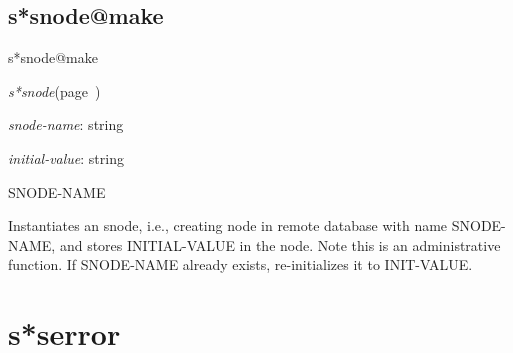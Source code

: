\subsection{s*snode@make}
\label{s*snode@make}

\begin{description}
\item [Name:]  s*snode@make

\item [Class:]
{\sl s*snode}\hfill(page~\pageref{s*snode})

\item [Parameters:]
\item {\sl snode-name}:  string

\item {\sl initial-value}:  string


\item [Return-value:] SNODE-NAME

\item [Description:]
Instantiates an snode, i.e., creating node in remote
database with name SNODE-NAME, and stores INITIAL-VALUE
in the node. Note this is an administrative function. If
SNODE-NAME already exists, re-initializes it to
INIT-VALUE.

\item [Public:]



\end{description}
\horizontalline

\section{s*serror}
\label{s*serror}

